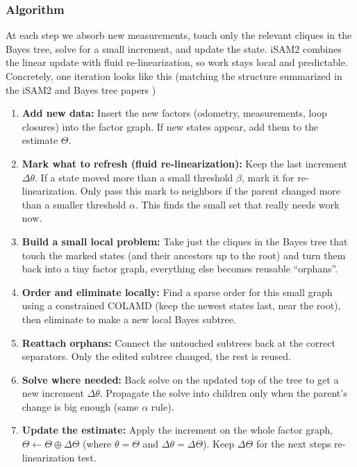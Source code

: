 \subsubsection{Algorithm}
At each step we absorb new measurements, touch only the relevant cliques in the Bayes tree, solve for a small increment, and update the state. iSAM2 combines the linear update with fluid re-linearization, so work stays local and predictable. Concretely, one iteration looks like this (matching the structure summarized in the iSAM2 and Bayes tree papers \cite{iSAM2_paper,Bayes_tree_for_SLAM_paper})
\begin{enumerate}
    \item \textbf{Add new data:} Insert the new factors (odometry, measurements, loop closures) into the factor graph. If new states appear, add them to the estimate $\Theta$.

    \item \textbf{Mark what to refresh (fluid re-linearization):} Keep the last increment $\Delta\theta$. If a state moved more than a small threshold $\beta$, mark it for re-linearization. Only pass this mark to neighbors if the parent changed more than a smaller threshold $\alpha$. This finds the small set that really needs work now.

    \item \textbf{Build a small local problem:} Take just the cliques in the Bayes tree that touch the marked states (and their ancestors up to the root) and turn them back into a tiny factor graph, everything else becomes reusable ``orphans''.

    \item \textbf{Order and eliminate locally:} Find a sparse order for this small graph using a constrained COLAMD (keep the newest states last, near the root), then eliminate to make a new local Bayes subtree.

    \item \textbf{Reattach orphans:} Connect the untouched subtrees back at the correct separators. Only the edited subtree changed, the rest is reused.

    \item \textbf{Solve where needed:} Back solve on the updated top of the tree to get a new increment $\Delta\theta$. Propagate the solve into children only when the parent's change is big enough (same $\alpha$ rule).

    \item \textbf{Update the estimate:} Apply the increment on the whole factor graph, $\Theta \leftarrow \Theta \oplus \Delta\Theta$ (where $\theta = \Theta$ and $\Delta\theta = \Delta\Theta$). Keep $\Delta\Theta$ for the next steps re-linearization test.


\end{enumerate}

